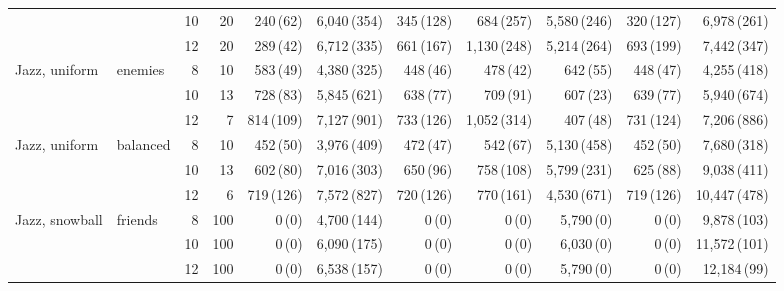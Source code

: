 \begin{table}[p]
{\begin{tabular}{llrrrrrrrrr}
 &  & 10 & 20 & 240\,{\scriptsize(62)} & 6,040\,{\scriptsize(354)} & 345\,{\scriptsize(128)} & 684\,{\scriptsize(257)} & 5,580\,{\scriptsize(246)} & 320\,{\scriptsize(127)} & 6,978\,{\scriptsize(261)} \\
 &  & 12 & 20 & 289\,{\scriptsize(42)} & 6,712\,{\scriptsize(335)} & 661\,{\scriptsize(167)} & 1,130\,{\scriptsize(248)} & 5,214\,{\scriptsize(264)} & 693\,{\scriptsize(199)} & 7,442\,{\scriptsize(347)} \\
\addlinespace[1pt]
Jazz, uniform & enemies & 8 & 10 & 583\,{\scriptsize(49)} & 4,380\,{\scriptsize(325)} & 448\,{\scriptsize(46)} & 478\,{\scriptsize(42)} & 642\,{\scriptsize(55)} & 448\,{\scriptsize(47)} & 4,255\,{\scriptsize(418)} \\
 &  & 10 & 13 & 728\,{\scriptsize(83)} & 5,845\,{\scriptsize(621)} & 638\,{\scriptsize(77)} & 709\,{\scriptsize(91)} & 607\,{\scriptsize(23)} & 639\,{\scriptsize(77)} & 5,940\,{\scriptsize(674)} \\
 &  & 12 & 7 & 814\,{\scriptsize(109)} & 7,127\,{\scriptsize(901)} & 733\,{\scriptsize(126)} & 1,052\,{\scriptsize(314)} & 407\,{\scriptsize(48)} & 731\,{\scriptsize(124)} & 7,206\,{\scriptsize(886)} \\
\addlinespace[1pt]
Jazz, uniform & balanced & 8 & 10 & 452\,{\scriptsize(50)} & 3,976\,{\scriptsize(409)} & 472\,{\scriptsize(47)} & 542\,{\scriptsize(67)} & 5,130\,{\scriptsize(458)} & 452\,{\scriptsize(50)} & 7,680\,{\scriptsize(318)} \\
 &  & 10 & 13 & 602\,{\scriptsize(80)} & 7,016\,{\scriptsize(303)} & 650\,{\scriptsize(96)} & 758\,{\scriptsize(108)} & 5,799\,{\scriptsize(231)} & 625\,{\scriptsize(88)} & 9,038\,{\scriptsize(411)} \\
 &  & 12 & 6 & 719\,{\scriptsize(126)} & 7,572\,{\scriptsize(827)} & 720\,{\scriptsize(126)} & 770\,{\scriptsize(161)} & 4,530\,{\scriptsize(671)} & 719\,{\scriptsize(126)} & 10,447\,{\scriptsize(478)} \\
\midrule
Jazz, snowball & friends & 8 & 100 & 0\,{\scriptsize(0)} & 4,700\,{\scriptsize(144)} & 0\,{\scriptsize(0)} & 0\,{\scriptsize(0)} & 5,790\,{\scriptsize(0)} & 0\,{\scriptsize(0)} & 9,878\,{\scriptsize(103)} \\
 &  & 10 & 100 & 0\,{\scriptsize(0)} & 6,090\,{\scriptsize(175)} & 0\,{\scriptsize(0)} & 0\,{\scriptsize(0)} & 6,030\,{\scriptsize(0)} & 0\,{\scriptsize(0)} & 11,572\,{\scriptsize(101)} \\
 &  & 12 & 100 & 0\,{\scriptsize(0)} & 6,538\,{\scriptsize(157)} & 0\,{\scriptsize(0)} & 0\,{\scriptsize(0)} & 5,790\,{\scriptsize(0)} & 0\,{\scriptsize(0)} & 12,184\,{\scriptsize(99)} \\

\end{tabular}}
\end{table}
